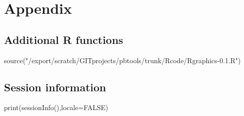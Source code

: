 \documentclass[
  10pt,
]{article}
\newenvironment{Shaded}{\begin{snugshade}}{\end{snugshade}}
\newcommand{\NormalTok}[1]{#1}
\begin{document}
\hypertarget{appendix}{%
\section{Appendix}\label{appendix}}

\hypertarget{additional-r-functions}{%
\subsection{Additional R functions}\label{additional-r-functions}}

\begin{Shaded}
\begin{Highlighting}[]
\NormalTok{source("/export/scratch/GITprojects/pbtools/trunk/Rcode/Rgraphics{-}0.1.R")}
\end{Highlighting}
\end{Shaded}

\hypertarget{session-information}{%
\subsection{Session information}\label{session-information}}

\begin{Shaded}
\begin{Highlighting}[]
\NormalTok{print(sessionInfo(),locale=FALSE)}
\end{Highlighting}
\end{Shaded}
\end{document}
